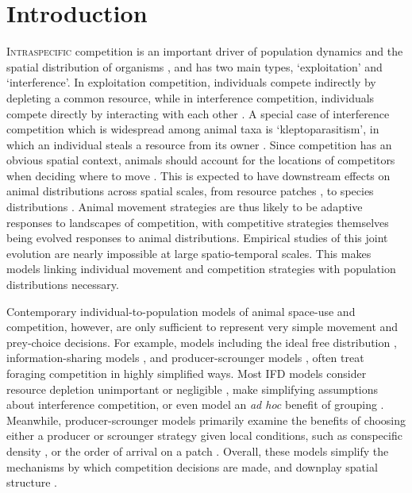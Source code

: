 \newpage

\section*{Introduction}

\lettrine{I}{ntraspecific} competition is an important driver of population dynamics and the spatial distribution of organisms \parencite{krebs1978}, and has two main types, `exploitation' and `interference'.
In exploitation competition, individuals compete indirectly by depleting a common resource, while in interference competition, individuals compete directly by interacting with each other \parencite{birch1957,case1974,keddy2001}.
A special case of interference competition which is widespread among animal taxa is `kleptoparasitism', in which an individual steals a resource from its owner \parencite{iyengar2008}.
Since competition has an obvious spatial context, animals should account for the locations of competitors when deciding where to move \parencite{nathan2008a}.
This is expected to have downstream effects on animal distributions across spatial scales, from resource patches \parencite{fretwell1970}, to species distributions \parencite{duckworth2007,schlagel2020a}.
Animal movement strategies are thus likely to be adaptive responses to landscapes of competition, with competitive strategies themselves being evolved responses to animal distributions.
Empirical studies of this joint evolution are nearly impossible at large spatio-temporal scales.
This makes models linking individual movement and competition strategies with population distributions necessary.

Contemporary individual-to-population models of animal space-use \parencite[reviewed in][]{deangelis2019} and competition, however, are only sufficient to represent very simple movement and prey-choice decisions.
For example, models including the ideal free distribution \parencite[IFD;][]{fretwell1970}, information-sharing models \parencite[][]{giraldeau1999,folmer2012}, and producer-scrounger models \parencite[][]{barnard1981,vickery1991,beauchamp2008}, often treat foraging competition in highly simplified ways.
Most IFD models consider resource depletion unimportant or negligible \parencite[continuous input models, see][]{tregenza1995, vandermeer1997}, make simplifying assumptions about interference competition, or even model an \textit{ad hoc} benefit of grouping \parencite[e.g.][]{amano2006b}.
Meanwhile, producer-scrounger models primarily examine the benefits of choosing either a producer or scrounger strategy given local conditions, such as conspecific density \parencite{vickery1991}, or the order of arrival on a patch \parencite{beauchamp2008}.
Overall, these models simplify the mechanisms by which competition decisions are made, and downplay spatial structure \parencite[see also][]{holmgren1995, garay2020, spencer2018}.

